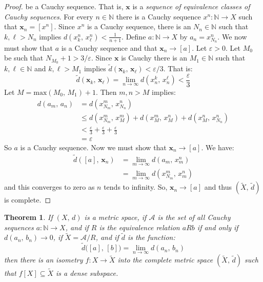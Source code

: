\documentclass{article}
\theoremstyle{plain}
\newtheorem{theorem}{Theorem}
\theoremstyle{normal}
\begin{document}
\begin{proof}
        be a Cauchy sequence. That is, $\mathbf{x}$ is a
        \textit{sequence of equivalence classes of Cauchy sequences}. For every
        $n\in\mathbb{N}$ there is a Cauchy sequence
        $x^{n}:\mathbb{N}\rightarrow{X}$ such that $\mathbf{x}_{n}=[x^{n}]$.
        Since $x^{n}$ is a Cauchy sequence, there is an $N_{n}\in\mathbb{N}$
        such that $k,\ell>N_{n}$ implies
        $d(x_{k}^{n},\,x_{\ell}^{n})<\frac{1}{n+1}$. Define
        $a:\mathbb{N}\rightarrow{X}$ by $a_{n}=x_{N_{n}}^{n}$. We now must
        show that $a$ is a Cauchy sequence and that
        $\mathbf{x}_{n}\rightarrow[a]$. Let $\varepsilon>0$. Let
        $M_{0}$ be such that $N_{M_{0}}+1>3/\varepsilon$. Since
        $\mathbf{x}$ is Cauchy there is an $M_{1}\in\mathbb{N}$ such that
        $k,\ell\in\mathbb{N}$ and $k,\ell>M_{1}$ implies
        $\tilde{d}(\mathbf{x}_{k},\,\mathbf{x}_{\ell})<\varepsilon/3$.
        That is:
        \begin{equation}
            \tilde{d}(\mathbf{x}_{k},\,\mathbf{x}_{\ell})
            =\lim_{n\rightarrow\infty}d(x_{n}^{k},\,x_{n}^{\ell})
            <\frac{\varepsilon}{3}
        \end{equation}
        Let $M=\textrm{max}(M_{0},\,M_{1})+1$. Then $m,n>M$ implies:
        \begin{align}
            d(a_{m},\,a_{n})
            &=d(x_{N_{m}}^{m},\,x_{N_{n}}^{n})\\
            &\leq{d}(x_{N_{m}}^{m},\,x_{M}^{m})
                +d(x_{M}^{m},\,x_{M}^{n})
                +d(x_{M}^{n},\,x_{N_{n}}^{n})\\
            &<\frac{\varepsilon}{3}
                +\frac{\varepsilon}{3}+\frac{\varepsilon}{3}\\
            &=\varepsilon
        \end{align}
        So $a$ is a Cauchy sequence. Now we must show that
        $\mathbf{x}_{n}\rightarrow[a]$. We have:
        \begin{align}
            \tilde{d}([a],\,\mathbf{x}_{n})
            &=\lim_{m\rightarrow\infty}d(a_{m},\,x_{m}^{n})\\
            &=\lim_{m\rightarrow\infty}d(x_{N_{m}}^{m},\,x_{m}^{n})
        \end{align}
        and this converges to zero as $n$ tends to infinity. So,
        $\mathbf{x}_{n}\rightarrow[a]$ and thus $(\tilde{X},\,\tilde{d})$
        is complete.
    \end{proof}
    \begin{theorem}
        If $(X,\,d)$ is a metric space, if $\mathcal{A}$ is the set of all
        Cauchy sequences $a:\mathbb{N}\rightarrow{X}$, and if
        $R$ is the equivalence relation $aRb$ if and only if
        $d(a_{n},\,b_{n})\rightarrow{0}$, if $\tilde{X}=\mathcal{A}/R$, and
        if $\tilde{d}$ is the function:
        \begin{equation}
            \tilde{d}\big([a],\,[b]\big)=\lim_{n\rightarrow\infty}
                d(a_{n},\,b_{n})
        \end{equation}
        then there is an isometry $f:X\rightarrow\tilde{X}$ into the
        complete metric space $(\tilde{X},\,\tilde{d})$ such that
        $f[X]\subseteq\tilde{X}$ is a dense subspace.
    \end{theorem}
\end{document}

